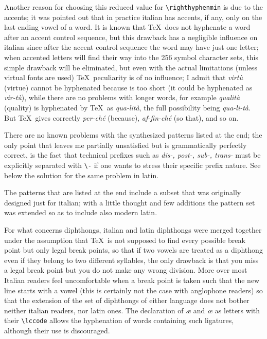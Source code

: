 \documentclass{ltugboat}
\begin{document}
Another reason for choosing this reduced value for \verb"\righthyphenmin" is
due to the accents; it was pointed out that in practice italian has accents,
if any, only on the last ending vowel of a word. It is known that \TeX\ does
not hyphenate a word after an accent control sequence, but this drawback has
a  negligible  influence  on italian since after the accent control sequence
the word may have just one letter; when accented letters will find their way
into the 256 symbol character sets, this simple drawback will be eliminated,
but even with the actual limitations (unless virtual fonts are  used)  \TeX\
peculiarity  is  of no influence; I admit that {\it virt\`u} (virtue) cannot
be hyphenated  because  is  too  short  (it  could  be  hyphenated  as  {\it
vir-t\`u\/}),  while  there  are  no problems with longer words, for example
{\it qualit\`a} (quality) is hyphenated by \TeX\ as  {\it  qua-lit\`a},  the
full  possibility  being  {\it  qua-li-t\`a}. But \TeX\ gives correctly {\it
per-ch\'e} (because), {\it af-fin-ch\'e} (so that), and so on.

There are no known problems with the synthesized patterns listed at the end;
the only point that leaves me partially  unsatisfied  but  is  grammatically
perfectly  correct,  is  the fact that technical prefixes such as {\it dis-,
post-, sub-, trans-} must be explicitly  separated  with  \verb"\-"  if  one
wants to stress their specific prefix nature. See below the solution for the
same problem in latin.



  The  patterns  that  are listed at the end include a
subset that was originally designed just for italian; with a little  thought
and  few additions the pattern set was extended so as to include also modern
latin.

For  what  concerns  diphthongs,  italian  and  latin diphthongs were merged
together under the assumption that \TeX\  is  not  supposed  to  find  every
possible  break point but only legal break points, so that if two vowels are
treated as a diphthong even if they belong to two different  syllables,  the
only  drawback  is that you miss a legal break point but you do not make any
wrong division. More over most Italian readers  feel  uncomfortable  when  a
break  point  is  taken  such that the new line starts with a vowel (this is
certainly not the case with anglophone readers) so that the extension of the
set  of  diphthongs  of    either  language  does not bother neither italian
readers, nor latin ones. The declaration of  {\it  \ae}  and  {\it  \oe}  as
letters with their \verb"\lccode" allows the hyphenation of words containing
such ligatures, although their use is discouraged.
\end{document}
